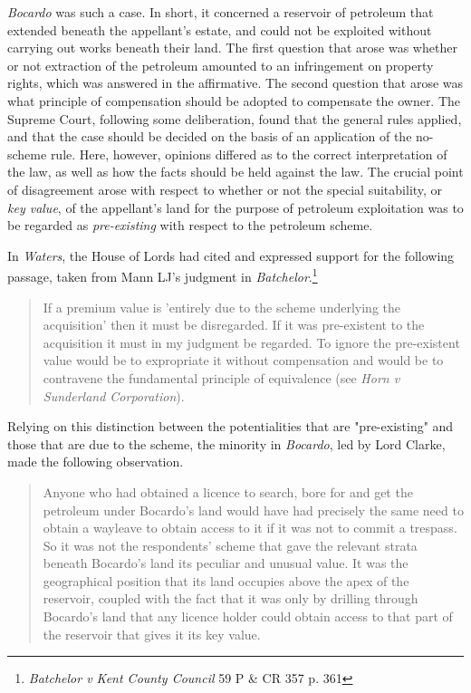 \emph{Bocardo} was such a case. In short, it concerned a reservoir of petroleum that extended beneath the appellant's estate, and could not be exploited without carrying out works beneath their land. The first question that arose was whether or not extraction of the petroleum amounted to an infringement on property rights, which was answered in the affirmative. The second question that arose was what principle of compensation should be adopted to compensate the owner. The Supreme Court, following some deliberation, found that the general rules applied, and that the case should be decided on the basis of an application of the no-scheme rule. Here, however, opinions differed as to the correct interpretation of the law, as well as how the facts should be held against the law. The crucial point of disagreement arose with respect to whether or not the special suitability, or \emph{key value}, of the appellant's land for the purpose of petroleum exploitation was to be regarded as \emph{pre-existing} with respect to the petroleum scheme.

In \emph{Waters}, the House of Lords had cited and expressed support for the following passage, taken from Mann LJ's judgment in \emph{Batchelor}.\footnote{\emph{Batchelor v Kent County Council} 59 P \& CR 357 p. 361}

\begin{quote}
If a premium value is 'entirely due to the scheme underlying the acquisition' then it must be disregarded. If it was pre-existent to the acquisition it must in my judgment be regarded. To ignore the pre-existent value would be to expropriate it without compensation and would be to contravene the fundamental principle of equivalence (see \emph{Horn v Sunderland Corporation}).
\end{quote}

Relying on this distinction between the potentialities that are "pre-existing" and those that are due to the scheme, the minority in \emph{Bocardo}, led by Lord Clarke, made the following observation.

\begin{quote}
Anyone who had obtained a licence to search, bore for and get the petroleum under Bocardo’s
land would have had precisely the same need to obtain a wayleave to obtain access
to it if it was not to commit a trespass. So it was not the respondents’ scheme that
gave the relevant strata beneath Bocardo’s land its peculiar and unusual value. It
was the geographical position that its land occupies above the apex of the
reservoir, coupled with the fact that it was only by drilling through Bocardo’s land
that any licence holder could obtain access to that part of the reservoir that gives it
its key value.
\end{quote}

